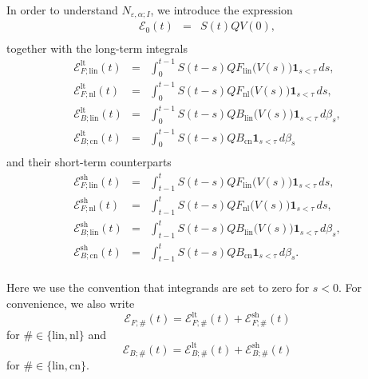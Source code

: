 \documentclass[10pt]{articleHJ}
\newcommand{\e}{\ensuremath{\varepsilon}}
\numberwithin{equation}{section}
\begin{document}
In order to understand $N_{\e,\alpha;I}$,
we introduce the expression
\begin{equation}
\begin{array}{lcl}
\mathcal{E}_{0}(t) &  = & S(t) Q V(0),
\\[0.2cm]
\end{array}
\end{equation}
together with the long-term integrals
\begin{equation}
\begin{array}{lclclcl}
\mathcal{E}^{\mathrm{lt}}_{F;\mathrm{lin}}(t) &  = &
  \int_0^{t-1} S(t  - s) Q F_{\mathrm{lin}}\big(V(s)\big)
  \mathbf{1}_{s < \tau} \, ds ,
\\[0.2cm]
%
\mathcal{E}^{\mathrm{lt}}_{F;\mathrm{nl}}(t) &  = &
  \int_0^{t-1} S(t  - s) Q F_{\mathrm{nl}}\big(V(s)\big)
  \mathbf{1}_{s < \tau} \, ds ,
\\[0.2cm]
%
\mathcal{E}^{\mathrm{lt}}_{B;\mathrm{lin}}(t)
  & = &
    \int_0^{t-1} S(t -s) Q B_{\mathrm{lin}}\big(V(s) \big)
     \mathbf{1}_{s < \tau} \,  d \beta_s,
\\[0.2cm]
\mathcal{E}^{\mathrm{lt}}_{B;\mathrm{cn}}(t)
  & = &
    \int_0^{t-1} S(t -s)Q B_{\mathrm{cn}}
    \mathbf{1}_{s < \tau} \, d \beta_s 
\\[0.2cm]
\end{array}
\end{equation}
and their short-term counterparts
\begin{equation}
\begin{array}{lclclcl}
\mathcal{E}^{\mathrm{sh}}_{F;\mathrm{lin}}(t) &  = &
  \int_{t-1}^{t} S(t - s) Q F_{\mathrm{lin}}\big(V(s)\big)
  \mathbf{1}_{s < \tau} \, ds ,
\\[0.2cm]
%
\mathcal{E}^{\mathrm{sh}}_{F;\mathrm{nl}}(t) &  = &
  \int_{t-1}^t S(t  - s) Q F_{\mathrm{nl}}\big(V(s)\big)
  \mathbf{1}_{s < \tau} \, ds ,
\\[0.2cm]
%
\mathcal{E}^{\mathrm{sh}}_{B;\mathrm{lin}}(t)
  & = &
    \int_{t-1}^t S(t -s) Q B_{\mathrm{lin}}\big(V(s) \big)
    \mathbf{1}_{s < \tau} \, d \beta_s,
\\[0.2cm]
\mathcal{E}^{\mathrm{sh}}_{B;\mathrm{cn}}(t)
  & = &
    \int_{t-1}^t S(t -s)Q B_{\mathrm{cn}}
    \mathbf{1}_{s < \tau} \, d \beta_s .
\\[0.2cm]
\end{array}
\end{equation}

Here we use the convention that integrands are set to zero for $s < 0$.
For convenience, we also write
\begin{equation}
\mathcal{E}_{F;\#}(t) = \mathcal{E}^{\mathrm{lt}}_{F;\#}(t) + \mathcal{E}^{\mathrm{sh}}_{F;\#}(t)
\end{equation}
for $\# \in \{\mathrm{lin},\mathrm{nl}\}$
and
\begin{equation}
\mathcal{E}_{B;\#}(t) = \mathcal{E}^{\mathrm{lt}}_{B;\#}(t) + \mathcal{E}^{\mathrm{sh}}_{B;\#}(t)
\end{equation}
for $\# \in \{\mathrm{lin},\mathrm{cn}\}$.
\end{document}
